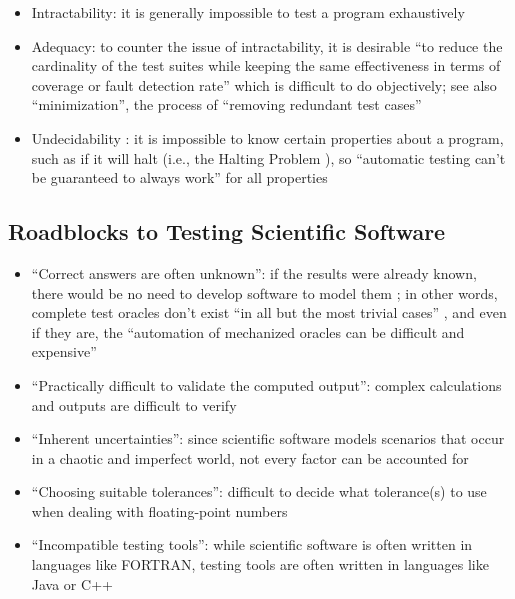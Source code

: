 \begin{itemize}
    \item Intractability: it is generally impossible to test a program
          exhaustively \exhInfCite{}
    \item Adequacy: to counter the issue of intractability, it is desirable
          ``to reduce the cardinality of the test suites while keeping the
          same effectiveness in terms of coverage or fault detection rate''
          \citep[p.~5-4]{SWEBOK2024} which is difficult to do objectively;
          see also ``minimization'', the process of ``removing redundant test
          cases'' \citep[p.~5-4]{SWEBOK2024}
    \item Undecidability \citep[p.~439]{PetersAndPedrycz2000}: it is
          impossible to know certain properties about a program, such as if
          it will halt (i.e., the Halting Problem
          \citep[p.~4]{gurfinkel_testing_2017}), so ``automatic testing
          can't be guaranteed to always work'' for all properties
          \citep{nelson_formal_1999} 
\end{itemize}

\subsection[Roadblocks to Testing Scientific Software]
{Roadblocks to Testing Scientific Software
    \citep[p.~67]{KanewalaAndYuehChen2019}}
\label{chap:testing:sec:sci-testing-roadblocks}
\begin{itemize}
    \item ``Correct answers are often unknown'': if the results were already
          known, there would be no need to develop software to model them
          \citep[p.~67]{KanewalaAndYuehChen2019}; in other words, complete
          test oracles don't exist ``in all but the most trivial cases''
          \citep[p.~510]{BarrEtAl2015}, and even if they are, the
          ``automation of mechanized oracles can be difficult and expensive''
          \citep[p.~5.5]{SWEBOK2024}
    \item ``Practically difficult to validate the computed output'': complex
          calculations and outputs are difficult to verify
          \citep[p.~67]{KanewalaAndYuehChen2019}
    \item ``Inherent uncertainties'': since scientific software models
          scenarios that occur in a chaotic and imperfect world, not every
          factor can be accounted for \citep[p.~67]{KanewalaAndYuehChen2019}
    \item ``Choosing suitable tolerances'': difficult to decide what
          tolerance(s) to use when dealing with floating-point numbers
          \citep[p.~67]{KanewalaAndYuehChen2019}
    \item ``Incompatible testing tools'': while scientific software is often
          written in languages like FORTRAN, testing tools are often written
          in languages like Java or C++ \citep[p.~67]{KanewalaAndYuehChen2019}
\end{itemize}

